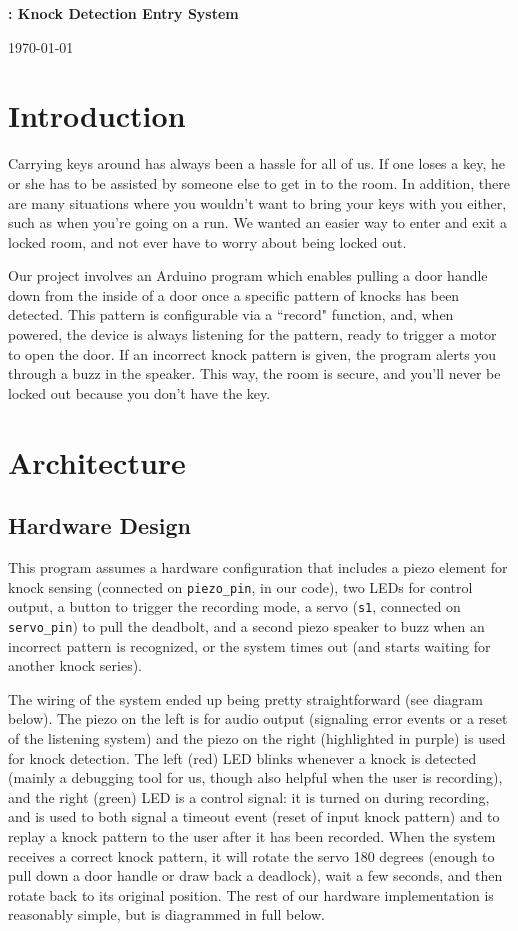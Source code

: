 \documentclass[11pt]{article}			%
\author{Matt Nichols}
\date{\today}
\begin{document}
\centerline{\bf \LARGE\thishw: Knock Detection Entry System}
\centerline{\today}

\section{Introduction}
Carrying keys around has always been a hassle for all of us. If one loses a key, he or she has to be assisted by someone else to get in to the room. In addition, there are many situations where you wouldn't want to bring your keys with you either, such as when you're going on a run. We wanted an easier way to enter and exit a locked room, and not ever have to worry about being locked out. 

Our project involves an Arduino program which enables pulling a door handle down from the inside of a door once a specific pattern of knocks has been detected. This pattern is configurable via a ``record" function, and, when powered, the device is always listening for the pattern, ready to trigger a motor to open the door. If an incorrect knock pattern is given, the program alerts you through a buzz in the speaker. This way, the room is secure, and you'll never be locked out because you don't have the key.

\section{Architecture}

\subsection{Hardware Design}

This program assumes a hardware configuration that includes a piezo element for knock sensing (connected on \verb|piezo_pin|, in our code), two LEDs for control output, a button to trigger the recording mode, a servo (\verb|s1|, connected on \verb|servo_pin|) to pull the deadbolt, and a second piezo speaker to buzz when an incorrect pattern is recognized, or the system times out (and starts waiting for another knock series).

The wiring of the system ended up being pretty straightforward (see diagram below). The piezo on the left is for audio output (signaling error events or a reset of the listening system) and the piezo on the right (highlighted in purple) is used for knock detection. The left (red) LED blinks whenever a knock is detected (mainly a debugging tool for us, though also helpful when the user is recording), and the right (green) LED is a control signal: it is turned on during recording, and is used to both signal a timeout event (reset of input knock pattern) and to replay a knock pattern to the user after it has been recorded. When the system receives a correct knock pattern, it will rotate the servo 180 degrees (enough to pull down a door handle or draw back a deadlock), wait a few seconds, and then rotate back to its original position. The rest of our hardware implementation is reasonably simple, but is diagrammed in full below.
\end{document}
